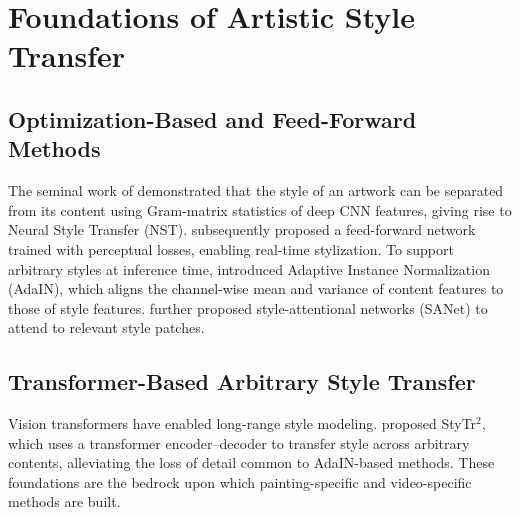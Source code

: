 \section{Foundations of Artistic Style Transfer}
\label{sec:style}

\subsection{Optimization-Based and Feed-Forward Methods}

The seminal work of \citet{gatys2016image} demonstrated that the style of an artwork can
be separated from its content using Gram-matrix statistics of deep CNN features, giving
rise to Neural Style Transfer (NST). \citet{johnson2016perceptual} subsequently proposed
a feed-forward network trained with perceptual losses, enabling real-time stylization.
To support arbitrary styles at inference time, \citet{huang2017arbitrary} introduced
Adaptive Instance Normalization (AdaIN), which aligns the channel-wise mean and variance
of content features to those of style features. \citet{park2019arbitrary} further
proposed style-attentional networks (SANet) to attend to relevant style patches.

\subsection{Transformer-Based Arbitrary Style Transfer}

Vision transformers have enabled long-range style modeling.
\citet{deng2021stytr2} proposed StyTr$^2$, which uses a transformer encoder--decoder to
transfer style across arbitrary contents, alleviating the loss of detail common to
AdaIN-based methods. These foundations are the bedrock upon which painting-specific and
video-specific methods are built.
